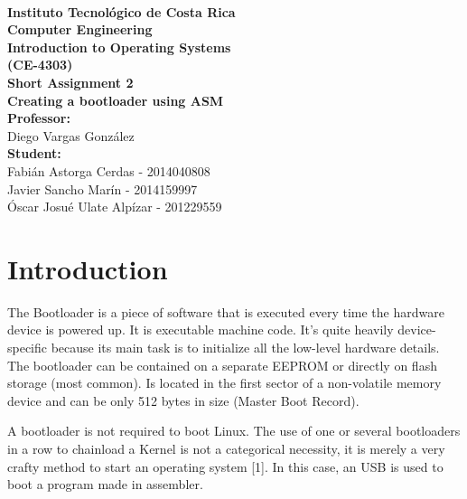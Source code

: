 \documentclass[11pt]{book}
\begin{document}
\begin{center}
\textbf{}\\[2cm]
\textbf{{\Huge Instituto Tecnológico de Costa Rica}}\\[2cm]
\textbf{{\LARGE Computer Engineering}}\\[1cm]
\textbf{{\LARGE  Introduction to Operating Systems}}\\[0cm]
\textbf{{\LARGE (CE-4303)}}\\[2.3cm] 

{\LARGE \textbf{Short Assignment 2}}\\[1cm]
{\LARGE \textbf{Creating a bootloader using ASM}}\\[2cm]

\textbf{{\large Professor:  }}\\[0,2cm]
{\large Diego Vargas González}\\[1cm]

\textbf{{\large Student: }}\\[0,2cm]
{\large Fabián Astorga Cerdas - 2014040808}\\[0,3cm]
{\large Javier Sancho Marín - 2014159997}\\[0,3cm]
{\large Óscar Josué Ulate Alpízar - 201229559}\\[0,3cm]
\date{}

\end{center}


\newpage
\section*{Introduction}


The Bootloader is a piece of software that is executed every time the hardware device is powered up. It is executable machine code. It's quite heavily device-specific because its main task is to initialize all the low-level hardware details. The bootloader can be contained on a separate EEPROM or directly on flash storage (most common). Is located in the first sector of a non-volatile memory device and can be only 512 bytes in size (Master Boot Record).

A bootloader is not required to boot Linux. The use of one or several bootloaders in a row to chainload a Kernel is not a categorical necessity, it is merely a very crafty method to start an operating system [1]. In this case, an USB is used to boot a program made in assembler. 
\end{document}
